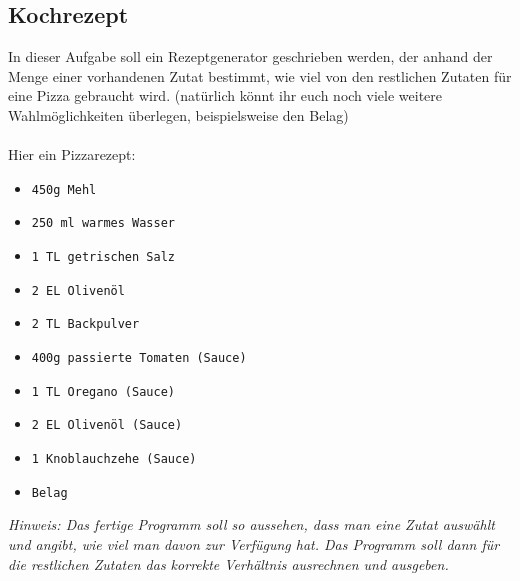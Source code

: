 \subsection{Kochrezept}
In dieser Aufgabe soll ein Rezeptgenerator geschrieben werden, der anhand der Menge einer vorhandenen Zutat bestimmt, wie viel von den restlichen Zutaten für eine Pizza gebraucht wird. (natürlich könnt ihr euch noch viele weitere Wahlmöglichkeiten überlegen, beispielsweise den Belag) \\
\\
Hier ein Pizzarezept: \\
\begin{multicols}{2}
    \begin{itemize}
        \item \texttt{450g Mehl}
        \item \texttt{250 ml warmes Wasser}
        \item \texttt{1 TL getrischen Salz}
        \item \texttt{2 EL Olivenöl}
        \item \texttt{2 TL Backpulver}
        \item \texttt{400g passierte Tomaten (Sauce)}
        \item \texttt{1 TL Oregano (Sauce)}
        \item \texttt{2 EL Olivenöl (Sauce)}
        \item \texttt{1 Knoblauchzehe (Sauce)}
        \item \texttt{Belag}
    \end{itemize}
\end{multicols}

\textit{Hinweis: Das fertige Programm soll so aussehen, dass man eine Zutat auswählt und angibt, wie viel man davon zur Verfügung hat. Das Programm soll dann für die restlichen Zutaten das korrekte Verhältnis ausrechnen und ausgeben.}